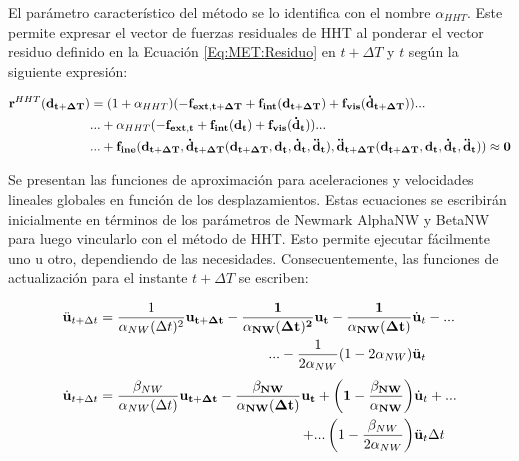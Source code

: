 El parámetro característico del método se lo identifica con el nombre $\alpha_{HHT}$. Este permite expresar el vector de fuerzas residuales de HHT al ponderar el vector residuo definido en la Ecuación \eqref{Eq:MET:Residuo} en $t+\Delta T$ y $t$ según la siguiente expresión:

\begin{equation}
	\label{Eq:MET:ResHHT}
	\begin{split}
		\bf{r}^{\text{$HHT$}}(\bf{d}_{t+\Delta T})&=(1+\alpha_\text{$HHT$})(-\bf{f}_{ext,t+\Delta T}+\bf{f}_{int}(\bf{d}_{t+\Delta T})+\bf{f}_{vis}(\dot{\bf{d}}_{t+\Delta T}))...\\	
		&...+\alpha_\text{$HHT$}(-\bf{f}_{ext,t}+\bf{f}_{int}(\bf{d}_{t})+\bf{f}_{vis}(\dot{\bf{d}}_{t}))...\\
		&...+\bf{f}_{ine}(\bf{d_{t+\Delta T}},\dot{\bf{d}}_{t+\Delta T}(d_{t+\Delta T},\bf{d_t},\bf{\dot{d}_t},\bf{\ddot{d}_t}),
		\ddot{\bf{d}}_{t+\Delta T}(d_{t+\Delta T},\bf{d_t},\bf{\dot{d}_t},\bf{\ddot{d}_t}))
		\approx 0
	\end{split}
\end{equation}


Se presentan las funciones de aproximación para aceleraciones y velocidades lineales globales en función de los desplazamientos. Estas ecuaciones se escribirán inicialmente en términos de los parámetros de Newmark \gls{AlphaNW} y \gls{BetaNW} para luego vincularlo con el método de HHT. Esto permite ejecutar fácilmente uno u otro, dependiendo de las necesidades. Consecuentemente, las funciones de actualización para el instante $t+\Delta T$ se escriben:

\begin{align}
	\ddot{\bf{u}}_{t+\Delta t} &=
	\begin{aligned}[t]
		\frac{1}{\alpha_{NW}(\Delta t)^2} \bf{u}_{t+\Delta t} - \frac{1}{\alpha_{NW} (\Delta t)^2} \bf{u}_{t} 	- \frac{1}{\alpha_{NW} (\Delta t)  }& \dot{\bf{u}}_{t}-... \\
		...-\frac{1}{2 \alpha_{NW}}  (1-2\alpha_{NW} ) &\ddot{\bf{u}}_{t} \\
	\end{aligned}
	\label{Eq:MET:AproxAceleracion} \\[\jot]
	\dot{\bf{u}}_{t+\Delta t} &=
	\begin{aligned}[t]
		\frac{\beta_{NW}}{\alpha_{NW} (\Delta t)} \bf{u}_{t+\Delta t}
		- \frac{\beta_{NW}}{\alpha_{NW} (\Delta t)} \bf{u}_{t}
		+ \left( 1 - \frac{\beta_{NW}}{\alpha_{NW}} \right) &\dot{\bf{u}}_{t}+... \\
		+ ...\left( 1- \frac{\beta_{NW}}{2 \alpha_{NW}} \right) &\ddot{\bf{u}}_{t} \Delta t
	\end{aligned}
	\label{Eq:MET:AproxVelcoity}
\end{align}


